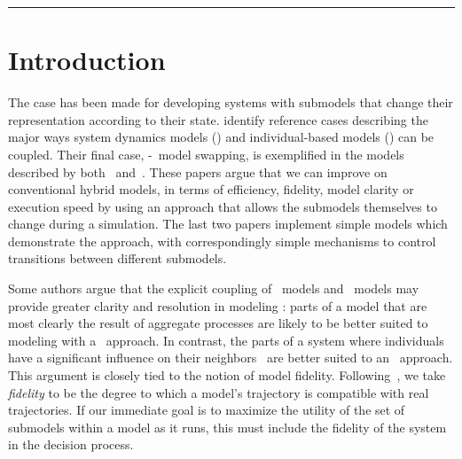 \rule{\textwidth}{2pt}




\section{Introduction}
The case has been made for developing systems with sub\-models that
change their rep\-re\-sen\-ta\-tion according to their state.
 identify reference cases describing the
major ways system dynamics models (\SD) and in\-di\-vidu\-al-based models
(\IB) can be coupled. Their final case, \SD-\IB\ model swapping, is
exemplified in the models described by both~\cite{bobashev2007hybrid}
and~\cite{Gray2012adaptive}. These papers argue that we can improve on
conventional hybrid models, in terms of efficiency, fidelity, model
clarity or execution speed by using an approach that allows the
sub\-models themselves to change during a simulation. The last two
papers implement simple models which demonstrate the approach, with
correspondingly simple mechanisms to control transitions between
different sub\-models. 

Some authors argue that the explicit coupling of \SD\ models and
\IB\ models may provide greater clarity and resolution in modeling
\citep{vincenot2011theoretical,Fulton2010approaches}: parts of a model that are
most clearly the result of aggregate processes are likely to be better
suited to modeling with a \SD\ approach. In contrast, the
parts of a system where in\-di\-vidu\-als have a significant influence on
their neighbors~\citep{botkin1972some} are better suited to an
\IB\ approach. This argument is closely tied to the notion of model
fidelity. Following~\cite{delsole2010model}, we take
\emph{fidelity} to be the degree to which a model's trajectory is
compatible with real trajectories.  If our immediate goal is to
maximize the utility of the set of sub\-models within a model
as it runs, this must include the fidelity of the system in the
decision process.

